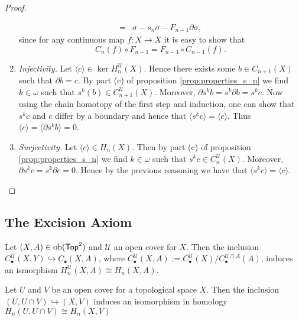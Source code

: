 \begin{proof}
\begin{enumerate}[label = \textit{Step \arabic*:},wide = 0pt]
\begin{align*}
				=& \sigma - s_n\sigma - F_{n - 1}\partial \sigma,
			\end{align*}
			\noindent since for any continuous map $f : X \to X$ it is easy to show that 
			\begin{equation*}
				C_n(f) \circ F_{n - 1} = F_{n - 1} \circ C_{n - 1}(f).
			\end{equation*}
		\item \textit{Injectivity.} Let $\langle c \rangle \in \ker H_n^\mathcal{U}(X)$. Hence there exists some $b \in C_{n + 1}(X)$ such that $\partial b = c$. By part (c) of proposition \ref{prop:properties_s_n} we find $k \in \omega$ such that $s^k(b) \in C_{n + 1}^\mathcal{U}(X)$. Moreover, $\partial s^k b = s^k \partial b = s^kc$. Now using the chain homotopy of the first step and induction, one can show that $s^kc$ and $c$ differ by a boundary and hence that $\langle s^k c \rangle = \langle c \rangle$. Thus $\langle c \rangle = \langle \partial s^k b \rangle = 0$.
		\item \textit{Surjectivity.} Let $\langle c \rangle \in H_n(X)$. Then by part (c) of proposition \ref{prop:properties_s_n} we find $k \in \omega$ such that $s^k c \in C_n^\mathcal{U}(X)$. Moreover, $\partial s^k c = s^k \partial c = 0$. Hence by the previous reasoning we have that $\langle s^kc \rangle = \langle c \rangle$.
	\end{enumerate}
\end{proof}

\subsection*{The Excision Axiom}

\begin{proposition}
	Let $(X,A) \in \operatorname{ob}(\mathsf{Top}^2)$ and $\mathcal{U}$ an open cover for $X$. Then the inclusion $C_\bullet^\mathcal{U}(X,Y) \hookrightarrow C_\bullet(X,A)$, where $C_\bullet^\mathcal{U}(X,A) := C_\bullet^\mathcal{U}(X)/C_\bullet^{\mathcal{U} \cap A}(A)$, induces an ismorphism $H_n^\mathcal{U}(X,A) \cong H_n(X,A)$. 
\end{proposition}

\begin{theorem}
	Let $U$ and $V$ be an open cover for a topological space $X$. Then the inclusion $(U,U \cap V) \hookrightarrow (X,V)$ induces an isomorphism in homology $H_n(U,U \cap V) \cong H_n(X,V)$
\end{theorem}

